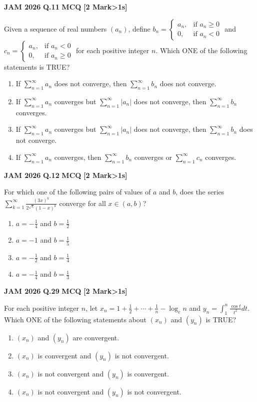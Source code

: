 \documentclass[11pt,a4paper]{article}
\newcommand{\pyqheader}[4]{%
    \noindent\begin{tcolorbox}[
        colback=badgebg,
        colframe=secondary,
        arc=2mm,
        boxrule=0.6pt,
        top=1.5mm,bottom=1.5mm,left=2mm,right=2mm
    ]
        \textbf{\textcolor{primary}{JAM #1}} \hfill \textbf{Q.#2} \hfill \textsc{\textbf{#3}} \hfill \textbf{[#4 Mark\ifnum#4>1s\fi]}
    \end{tcolorbox}\vspace{-1mm}
}
\begin{document}
\pyqheader{2026}{11}{MCQ}{2}
Given a sequence of real numbers $(a_{n})$, define $b_{n}=\begin{cases}a_{n},& \text{if } a_{n}\ge 0\\ 0,& \text{if } a_{n}<0\end{cases}$ and $c_{n}=\begin{cases}a_{n},& \text{if } a_{n}< 0\\ 0,& \text{if } a_{n}\ge 0\end{cases}$ for each positive integer $n$. Which ONE of the following statements is TRUE?
\begin{enumerate}[label=(\Alph*)]
    \item If $\sum_{n=1}^{\infty}a_{n}$ does not converge, then $\sum_{n=1}^{\infty}b_{n}$ does not converge.
    \item If $\sum_{n=1}^{\infty}a_{n}$ converges but $\sum_{n=1}^{\infty}|a_{n}|$ does not converge, then $\sum_{n=1}^{\infty}b_{n}$ converges.
    \item If $\sum_{n=1}^{\infty}a_{n}$ converges but $\sum_{n=1}^{\infty}|a_{n}|$ does not converge, then $\sum_{n=1}^{\infty}b_{n}$ does not converge.
    \item If $\sum_{n=1}^{\infty}a_{n}$ converges, then $\sum_{n=1}^{\infty}b_{n}$ converges or $\sum_{n=1}^{\infty}c_{n}$ converges.
\end{enumerate}

\pyqheader{2026}{12}{MCQ}{2}
For which one of the following pairs of values of $a$ and $b$, does the series $\sum_{k=1}^{\infty}\frac{(3x)^{k}}{2^{\sqrt{k}}(1-x)^{k}}$ converge for all $x\in(a,b)$?
\begin{enumerate}[label=(\Alph*)]
    \item $a=-\frac{1}{4}$ and $b=\frac{1}{2}$
    \item $a=-1$ and $b=\frac{1}{5}$
    \item $a=-\frac{1}{2}$ and $b=\frac{1}{4}$
    \item $a=-\frac{1}{4}$ and $b=\frac{1}{3}$
\end{enumerate}

\pyqheader{2026}{29}{MCQ}{2}
For each positive integer $n$, let $x_{n}=1+\frac{1}{2}+\cdots+\frac{1}{n}-\log_{e}n$ and $y_{n}=\int_{1}^{n}\frac{\cos t}{t^{2}}dt$. Which ONE of the following statements about $(x_{n})$ and $(y_{n})$ is TRUE?
\begin{enumerate}[label=(\Alph*)]
    \item $(x_{n})$ and $(y_{n})$ are convergent.
    \item $(x_{n})$ is convergent and $(y_{n})$ is not convergent.
    \item $(x_{n})$ is not convergent and $(y_{n})$ is convergent.
    \item $(x_{n})$ is not convergent and $(y_{n})$ is not convergent.
\end{enumerate}
\end{document}
